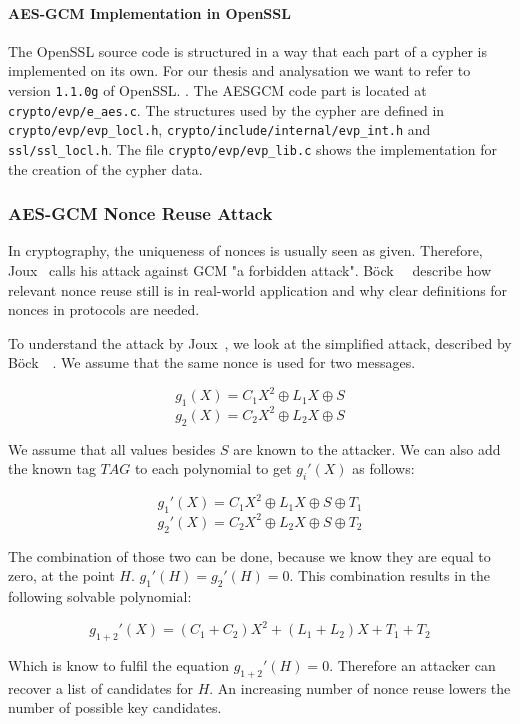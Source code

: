 \paragraph{AES-GCM Implementation in OpenSSL}

The OpenSSL source code is structured in a way that each part of a cypher is
implemented on its own. For our thesis and analysation we want to refer to
version \texttt{1.1.0g} of OpenSSL. . The AESGCM code
part is located at \texttt{crypto/evp/e\_aes.c}. The structures used by the
cypher are defined in \texttt{crypto/evp/evp\_locl.h},
\texttt{crypto/include/internal/evp\_int.h} and \texttt{ssl/ssl\_locl.h}. The
file \texttt{crypto/evp/evp\_lib.c} shows the implementation for the creation of
the cypher data.

\subsubsection{AES-GCM Nonce Reuse Attack}

In cryptography, the uniqueness of nonces is usually seen as given. Therefore,
Joux~\cite{NISTGCMcomment} calls his attack against GCM "a forbidden attack".
Böck~\etal~\cite{gcmnonceattack} describe how relevant nonce reuse still is in
real-world application and why clear definitions for nonces in protocols
are needed.

To understand the attack by Joux~\cite{NISTGCMcomment}, we look at the
simplified attack, described by Böck~\etal~\cite{gcmnonceattack}. We assume
that the same nonce is used for two messages.

\[g_1(X) = C{_{1}X^2 \oplus L_1X \oplus S}\]
\[g_2(X) = C{_{2}X^2 \oplus L_2X \oplus S}\]

We assume that all values besides $S$ are known to the attacker. We can also
add the known tag $TAG$ to each polynomial to get $g_i'(X)$ as follows:

\[g_1'(X) = C{_{1}X^2 \oplus L_1X \oplus S \oplus T_1}\]
\[g_2'(X) = C{_{2}X^2 \oplus L_2X \oplus S \oplus T_2}\]

The combination of those two can be done, because we know they are equal to
zero, at the point $H$. $g_1'(H) = g_2'(H) = 0$. This combination results in
the following solvable polynomial:

\[g_{1+2}'(X) = (C_{1} + C_{2})X^2 + (L_1 + L_2)X + T_1 + T_2\]

Which is know to fulfil the equation $g_{1+2}'(H) = 0$. Therefore an attacker
can recover a list of candidates for $H$. An increasing number of nonce
reuse lowers the number of possible key candidates.

